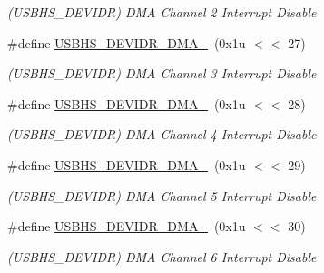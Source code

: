 \begin{DoxyCompactItemize}
\begin{DoxyCompactList}\small\item\em (U\+S\+B\+H\+S\+\_\+\+D\+E\+V\+I\+DR) D\+MA Channel 2 Interrupt Disable \end{DoxyCompactList}\item 
\mbox{\label{group__SAME70__USBHS_gad447f7973e83a2cf9f5e58e5192e7472}} 
\#define \mbox{\hyperlink{group__SAME70__USBHS_gad447f7973e83a2cf9f5e58e5192e7472}{U\+S\+B\+H\+S\+\_\+\+D\+E\+V\+I\+D\+R\+\_\+\+D\+M\+A\+\_}}~(0x1u $<$$<$ 27)
\begin{DoxyCompactList}\small\item\em (U\+S\+B\+H\+S\+\_\+\+D\+E\+V\+I\+DR) D\+MA Channel 3 Interrupt Disable \end{DoxyCompactList}\item 
\mbox{\label{group__SAME70__USBHS_gaaf3c1efa98e84b78bb7d7d0191936406}} 
\#define \mbox{\hyperlink{group__SAME70__USBHS_gaaf3c1efa98e84b78bb7d7d0191936406}{U\+S\+B\+H\+S\+\_\+\+D\+E\+V\+I\+D\+R\+\_\+\+D\+M\+A\+\_}}~(0x1u $<$$<$ 28)
\begin{DoxyCompactList}\small\item\em (U\+S\+B\+H\+S\+\_\+\+D\+E\+V\+I\+DR) D\+MA Channel 4 Interrupt Disable \end{DoxyCompactList}\item 
\mbox{\label{group__SAME70__USBHS_ga4cb9a975fc02e8ff3ebce0943b7d99ce}} 
\#define \mbox{\hyperlink{group__SAME70__USBHS_ga4cb9a975fc02e8ff3ebce0943b7d99ce}{U\+S\+B\+H\+S\+\_\+\+D\+E\+V\+I\+D\+R\+\_\+\+D\+M\+A\+\_}}~(0x1u $<$$<$ 29)
\begin{DoxyCompactList}\small\item\em (U\+S\+B\+H\+S\+\_\+\+D\+E\+V\+I\+DR) D\+MA Channel 5 Interrupt Disable \end{DoxyCompactList}\item 
\mbox{\label{group__SAME70__USBHS_gae7c9b7dc9158c83a2f29c2da518cd04d}} 
\#define \mbox{\hyperlink{group__SAME70__USBHS_gae7c9b7dc9158c83a2f29c2da518cd04d}{U\+S\+B\+H\+S\+\_\+\+D\+E\+V\+I\+D\+R\+\_\+\+D\+M\+A\+\_}}~(0x1u $<$$<$ 30)
\begin{DoxyCompactList}\small\item\em (U\+S\+B\+H\+S\+\_\+\+D\+E\+V\+I\+DR) D\+MA Channel 6 Interrupt Disable \end{DoxyCompactList}\item 

\end{DoxyCompactItemize}
